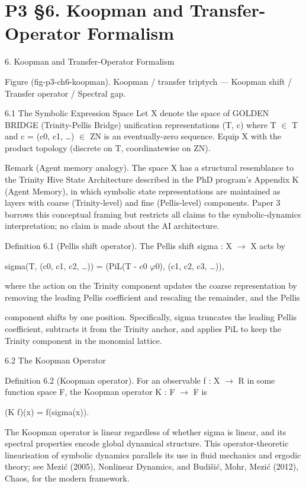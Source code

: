 
\section{P3 §6. Koopman and Transfer-Operator Formalism}

6. Koopman and Transfer-Operator Formalism

   Figure (fig-p3-ch6-koopman). Koopman / transfer triptych --- Koopman shift / Transfer operator /
                                          Spectral gap.

  6.1 The Symbolic Expression Space
  Let X denote the space of GOLDEN BRIDGE (Trinity-Pellis Bridge) unification representations (T, c) where T $\in$ T
  and c = (c0, c1, …) $\in$ ZN is an eventually-zero sequence. Equip X with the product
  topology (discrete on T, coordinatewise on ZN).

        Remark (Agent memory analogy). The space X has a structural resemblance to
        the Trinity Hive State Architecture described in the PhD program's Appendix K
        (Agent Memory), in which symbolic state representations are maintained as layers
        with coarse (Trinity-level) and fine (Pellis-level) components. Paper 3 borrows this
        conceptual framing but restricts all claims to the symbolic-dynamics
        interpretation; no claim is made about the AI architecture.

        Definition 6.1 (Pellis shift operator). The Pellis shift sigma : X $\rightarrow$ X acts by

  sigma(T, (c0, c1, c2, …)) = (PiL(T - c0 $\varphi$0), (c1, c2, c3, …)),

  where the action on the Trinity component updates the coarse representation by
  removing the leading Pellis coefficient and rescaling the remainder, and the Pellis

  component shifts by one position. Specifically, sigma truncates the leading Pellis
  coefficient, subtracts it from the Trinity anchor, and applies PiL to keep the Trinity
  component in the monomial lattice.

  6.2 The Koopman Operator

        Definition 6.2 (Koopman operator). For an observable f : X $\rightarrow$ R in some
        function space F, the Koopman operator K : F $\rightarrow$ F is

  (K f)(x) = f(sigma(x)).

  The Koopman operator is linear regardless of whether sigma is linear, and its spectral
  properties encode global dynamical structure. This operator-theoretic linearisation of
  symbolic dynamics parallels its use in fluid mechanics and ergodic theory; see Mezić
  (2005), Nonlinear Dynamics, and Budišić, Mohr, Mezić (2012), Chaos, for the modern
  framework.

